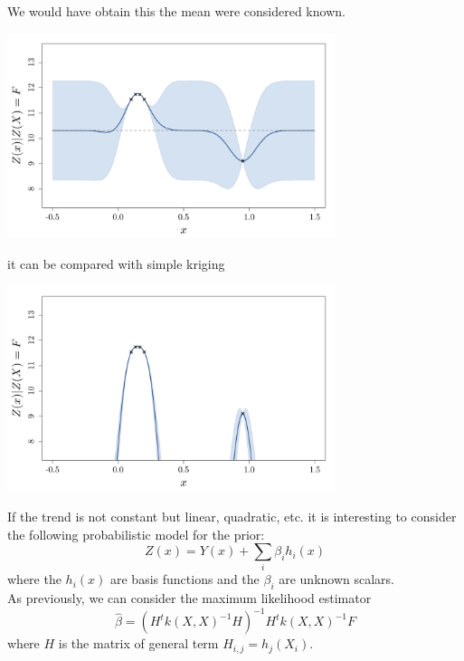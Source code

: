 \documentclass{beamer}
\begin{document}
\begin{frame}{}
We would have obtain this the mean were considered known.
\begin{center}
	\includegraphics[height=6cm]{figures/R/trend_badko}
\end{center}
\end{frame}

\begin{frame}{}
it can be compared with simple kriging
\begin{center}
	\includegraphics[height=6cm]{figures/R/trend_badks}
\end{center}
\end{frame}

\begin{frame}{}
If the trend is not constant but linear, quadratic, etc. it is interesting to consider the following probabilistic model for the prior:
\begin{equation*}
	Z(x) = Y(x) + \sum_i \beta_i h_i(x)
\end{equation*}
where the $h_i(x)$ are basis functions and the $\beta_i$ are unknown scalars.\\ \vspace{5mm}
As previously, we can consider the maximum likelihood estimator 
\begin{equation*}
 \hat{\beta} = (H^t k(X,X)^{-1} H)^{-1} H^t k(X,X)^{-1} F 
\end{equation*} 
where $H$ is the matrix of general term $H_{i,j}=h_j(X_i)$.
\end{frame}
\end{document}
